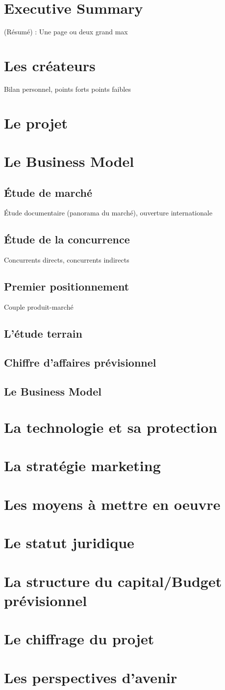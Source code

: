 \documentclass[a4paper,12pt]{report}
\begin{document}


\section{Executive Summary}
(Résumé) : Une page ou deux grand max
\section{Les créateurs}
Bilan personnel, points forts points faibles
\section{Le projet}
\section{Le Business Model}
\subsection{Étude de marché}
Étude documentaire (panorama du marché), ouverture internationale
\subsection{Étude de la concurrence}
Concurrents directs, concurrents indirects
\subsection{Premier positionnement}
Couple produit-marché
\subsection{L'étude terrain}
\subsection{Chiffre d'affaires prévisionnel}
\subsection{Le Business Model}
\section{La technologie et sa protection}
\section{La stratégie marketing}
\section{Les moyens à mettre en oeuvre}
\section{Le statut juridique}
\section{La structure du capital/Budget prévisionnel}
\section{Le chiffrage du projet}
\section{Les perspectives d'avenir}
\end{document}
